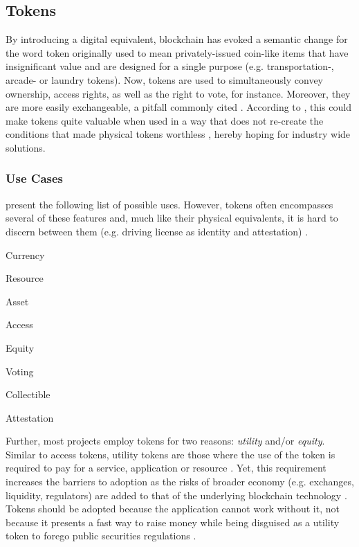 \subsection{Tokens}
By introducing a digital equivalent, blockchain has evoked a semantic change for the word token originally used to mean privately-issued coin-like items that have insignificant value and are designed for a single purpose (e.g. transportation-, arcade- or laundry tokens). Now, tokens are used to simultaneously convey ownership, access rights, as well as the right to vote, for instance. Moreover, they are more easily exchangeable, a pitfall commonly cited \cite[p.~173]{Antonopoulos.2018}. According to \citeauthor{Antonopoulos.2018}, this could make tokens quite valuable when used in a way that does not re-create the conditions that made physical tokens worthless \cite[p.~178]{Antonopoulos.2018}, hereby hoping for industry wide solutions. 

\subsubsection{Use Cases}
\citeauthor{Antonopoulos.2018} present the following list of possible uses. However, tokens often encompasses several of these features and, much like their physical equivalents, it is hard to discern between them (e.g. driving license as identity and attestation) \cite[pp.~173-174]{Antonopoulos.2018}.

\begin{AutoMultiColItemize}
  \item Currency
  \item Resource
  \item Asset
  \item Access
  \item Equity
  \item Voting
  \item Collectible
  \item Attestation
\end{AutoMultiColItemize}


Further, most projects employ tokens for two reasons: \textit{utility} and/or \textit{equity}. Similar to access tokens, utility tokens are those where the use of the token is required to pay for a service, application or resource \cite[p.~176]{Antonopoulos.2018}. Yet, this requirement increases the barriers to adoption as the risks of broader economy (e.g. exchanges, liquidity, regulators) are added to that of the underlying blockchain technology \cite[pp.~177]{Antonopoulos.2018}. Tokens should be adopted because the application cannot work without it, not because it presents a fast way to raise money while being disguised as a utility token to forego public securities regulations \cite[p.~178]{Antonopoulos.2018}.

